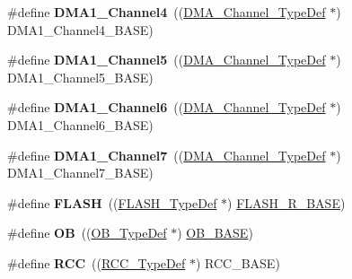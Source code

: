 \begin{DoxyCompactItemize}
\#define {\bfseries D\+M\+A1\+\_\+\+Channel4}~((\hyperlink{struct_d_m_a___channel___type_def}{D\+M\+A\+\_\+\+Channel\+\_\+\+Type\+Def} $\ast$) D\+M\+A1\+\_\+\+Channel4\+\_\+\+B\+A\+SE)
\item 
\mbox{\label{group___peripheral__declaration_ga06ff98ddef3c962795d2e2444004abff}} 
\#define {\bfseries D\+M\+A1\+\_\+\+Channel5}~((\hyperlink{struct_d_m_a___channel___type_def}{D\+M\+A\+\_\+\+Channel\+\_\+\+Type\+Def} $\ast$) D\+M\+A1\+\_\+\+Channel5\+\_\+\+B\+A\+SE)
\item 
\mbox{\label{group___peripheral__declaration_gac013c4376e4797831b5ddd2a09519df8}} 
\#define {\bfseries D\+M\+A1\+\_\+\+Channel6}~((\hyperlink{struct_d_m_a___channel___type_def}{D\+M\+A\+\_\+\+Channel\+\_\+\+Type\+Def} $\ast$) D\+M\+A1\+\_\+\+Channel6\+\_\+\+B\+A\+SE)
\item 
\mbox{\label{group___peripheral__declaration_ga4f9c23b3d1add93ed206b5c9afa5cda3}} 
\#define {\bfseries D\+M\+A1\+\_\+\+Channel7}~((\hyperlink{struct_d_m_a___channel___type_def}{D\+M\+A\+\_\+\+Channel\+\_\+\+Type\+Def} $\ast$) D\+M\+A1\+\_\+\+Channel7\+\_\+\+B\+A\+SE)
\item 
\mbox{\label{group___peripheral__declaration_ga844ea28ba1e0a5a0e497f16b61ea306b}} 
\#define {\bfseries F\+L\+A\+SH}~((\hyperlink{struct_f_l_a_s_h___type_def}{F\+L\+A\+S\+H\+\_\+\+Type\+Def} $\ast$) \hyperlink{group___peripheral__memory__map_ga8e21f4845015730c5731763169ec0e9b}{F\+L\+A\+S\+H\+\_\+\+R\+\_\+\+B\+A\+SE})
\item 
\mbox{\label{group___peripheral__declaration_gad2d5f875cdc6d696735f20fa23a895c3}} 
\#define {\bfseries OB}~((\hyperlink{struct_o_b___type_def}{O\+B\+\_\+\+Type\+Def} $\ast$) \hyperlink{group___peripheral__memory__map_gab5b5fb155f9ee15dfb6d757da1adc926}{O\+B\+\_\+\+B\+A\+SE})
\item 
\mbox{\label{group___peripheral__declaration_ga74944438a086975793d26ae48d5882d4}} 
\#define {\bfseries R\+CC}~((\hyperlink{struct_r_c_c___type_def}{R\+C\+C\+\_\+\+Type\+Def} $\ast$) R\+C\+C\+\_\+\+B\+A\+SE)
\item 
\mbox{\label{group___peripheral__declaration_ga4381bb54c2dbc34500521165aa7b89b1}} 

\end{DoxyCompactItemize}
